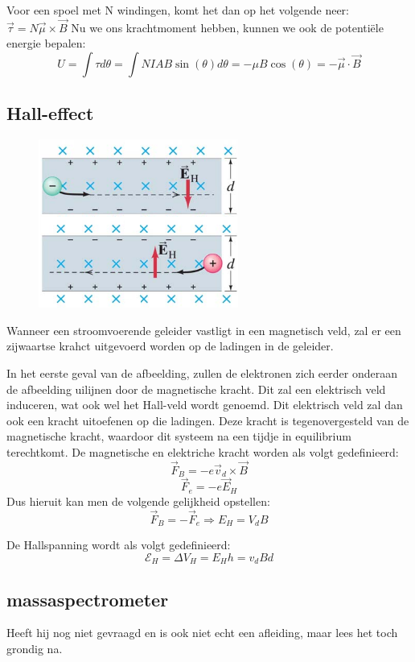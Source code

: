 \documentclass[12pt,a4paper]{article}
\begin{document}
	Voor een spoel met N windingen, komt het dan op het volgende neer:
	\(\vec{\tau} = N\vec{\mu}\times\vec{B}\)
	\newline
	\newline
	Nu we ons krachtmoment hebben, kunnen we ook de potentiële energie bepalen: 
	\[U = \int\tau d\theta = \int NIAB\sin(\theta)d\theta = -\mu B \cos(\theta) = -\vec{\mu}\cdot\vec{B}\]
	
	\newpage
	\subsection{Hall-effect}
	\begin{figure}
		\centering
		\includegraphics[width=0.5\linewidth]{images/27.8}
	\end{figure}
	
	Wanneer een stroomvoerende geleider vastligt in een magnetisch veld, zal er een zijwaartse krahct uitgevoerd worden op de ladingen in de geleider. 
	
	In het eerste geval van de afbeelding, zullen de elektronen zich eerder onderaan de afbeelding uilijnen door de magnetische kracht. Dit zal een elektrisch veld induceren, wat ook wel het Hall-veld wordt genoemd. Dit elektrisch veld zal dan ook een kracht uitoefenen op die ladingen. Deze kracht is tegenovergesteld van de magnetische kracht, waardoor dit systeem na een tijdje in equilibrium terechtkomt. 
	De magnetische en elektriche kracht worden als volgt gedefinieerd:
	\[\vec{F}_B = -e\vec{v}_d\times\vec{B}\]
	\[\vec{F}_e = -e\vec{E}_H\]
	Dus hieruit kan men de volgende gelijkheid opstellen: 
	\[\vec{F}_B = -\vec{F}_e \Rightarrow E_H = V_dB\]
	
	De Hallspanning wordt als volgt gedefinieerd: 
	\[\mathcal{E}_H = \Delta V_H = E_Hh = v_d B d\]
	
	\subsection{massaspectrometer}
	Heeft hij nog niet gevraagd en is ook niet echt een afleiding, maar lees het toch grondig na. 
	
\end{document}
